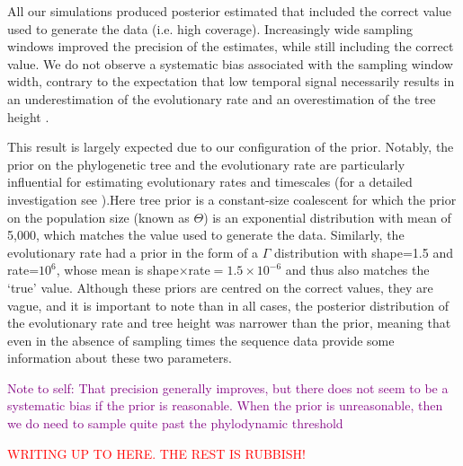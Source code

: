\documentclass[11pt]{article}
\begin{document}
All our simulations produced posterior estimated that included the correct value used to generate the data (i.e. high coverage). Increasingly wide sampling windows improved the precision of the estimates, while still including the correct value. We do not observe a systematic bias associated with the sampling window width, contrary to the expectation that low temporal signal necessarily results in an underestimation of the evolutionary rate and an overestimation of the tree height \citep{duchene2015performance}.

This result is largely expected due to our configuration of the prior. Notably, the prior on the phylogenetic tree and the evolutionary rate are particularly influential for estimating evolutionary rates and timescales (for a detailed investigation see \cite{tay2024assessing}).Here tree prior is a constant-size coalescent for which the prior on the population size (known as $\Theta$) is an exponential distribution with mean of 5,000, which matches the value used to generate the data. Similarly, the evolutionary rate had a prior in the form of a $\Gamma$ distribution with shape=1.5 and rate=$10^{6}$, whose mean is shape$\times$rate$=1.5\times10^{-6}$ and thus also matches the `true' value. Although these priors are centred on the correct values, they are vague, and it is important to note than in all cases, the posterior distribution of the evolutionary rate and tree height was narrower than the prior, meaning that even in the absence of sampling times the sequence data provide some information about these two parameters.


\textcolor{purple}{Note to self: That precision generally improves, but there does not seem to be a systematic bias if the prior is reasonable. When the prior is unreasonable, then we do need to sample quite past the phylodynamic threshold}



\textcolor{red}{WRITING UP TO HERE. THE REST IS RUBBISH!}
\end{document}
